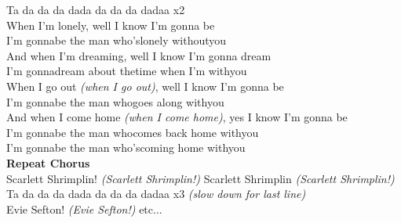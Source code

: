 Ta da da da dada da da da dadaa x2\\
When I’m lonely, well I know I’m gonna be\\
I’m gonnabe the man who’slonely withoutyou\\
And when I’m dreaming, well I know I’m gonna dream\\
I’m gonnadream about thetime when I’m withyou\\
When I go out \emph{(when I go out)}, well I know I’m gonna be\\
I’m gonnabe the man whogoes along withyou\\
And when I come home \emph{(when I come home)}, yes I know I’m gonna be\\
I’m gonnabe the man whocomes back home withyou\\
I’m gonnabe the man who’scoming home withyou\\
\textbf{Repeat Chorus}\\
Scarlett Shrimplin! \emph{(Scarlett Shrimplin!)} Scarlett Shrimplin \emph{(Scarlett Shrimplin!)}\\
Ta da da da dada da da da dadaa x3 \emph{(slow down for last line)}\\
Evie Sefton! \emph{(Evie Sefton!)} etc...
